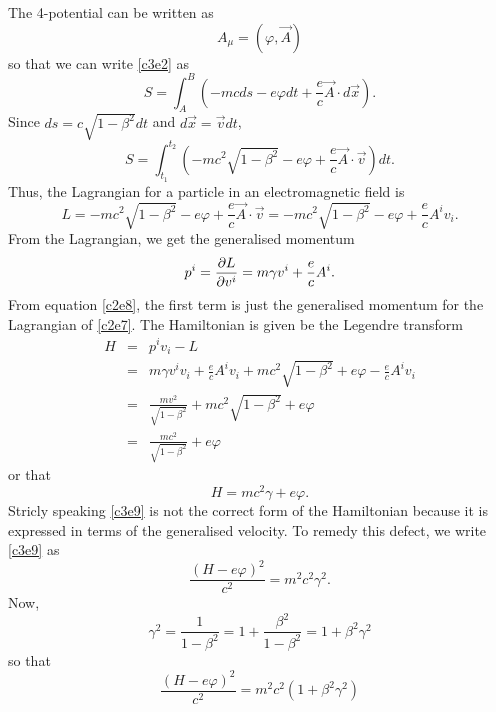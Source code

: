 \begin{enumerate}
The 4-potential can be written as 
\begin{equation}\label{c3e3}
A_\mu = (\varphi, \vec{A})
\end{equation}
so that we can write \eqref{c3e2} as
\begin{equation}\label{c3e4}
S = \int_A^B\left(-mcds - e\varphi dt + 
\frac{e}{c}\vec{A}\cdot d\vec{x}\right).
\end{equation}
Since $ds = c\sqrt{1 - \beta^2}dt$ and $d\vec{x} = \vec{v}dt$,
\begin{equation}\label{c3e5}
S = \int_{t_1}^{t_2}\left(-mc^2\sqrt{1 - \beta^2} - e\varphi + 
\frac{e}{c}\vec{A}\cdot\vec{v}\right)dt.
\end{equation}
Thus, the Lagrangian for a particle in an electromagnetic field is
\begin{equation}\label{c3e6}
L = -mc^2\sqrt{1 - \beta^2} - e\varphi + \frac{e}{c}\vec{A}\cdot\vec{v}
= -mc^2\sqrt{1 - \beta^2} - e\varphi + \frac{e}{c}A^i v_i.
\end{equation}
From the Lagrangian, we get the generalised momentum
\begin{equation}\label{c3e7}
p^i = \frac{\partial{L}}{\partial{v^i}} = m\gamma v^i + \frac{e}{c}A^i.
\end{equation}
From equation \eqref{c2e8}, the first term is just the generalised momentum for
the Lagrangian of \eqref{c2e7}. The Hamiltonian is given be the Legendre
transform
\begin{eqnarray*}
H &=& p^iv_i - L \\
  &=& m\gamma v^iv_i + \frac{e}{c}A^iv_i + mc^2\sqrt{1 - \beta^2} + e\varphi - 
  \frac{e}{c}A^iv_i \\
  &=& \frac{mv^2}{\sqrt{1 - \beta^2}} + mc^2\sqrt{1 - \beta^2} + e\varphi \\
  &=& \frac{mc^2}{\sqrt{1 - \beta^2}} + e\varphi
\end{eqnarray*}
or that
\begin{equation}\label{c3e8}
H = mc^2\gamma + e\varphi.
\end{equation}
Stricly speaking \eqref{c3e9} is not the correct form of the Hamiltonian because 
it is expressed in terms of the generalised velocity. To remedy this defect, we 
write
\eqref{c3e9} as
\[
\frac{(H - e\varphi)^2}{c^2} = m^2c^2 \gamma^2.
\]
Now,
\begin{equation}\label{c3e9}
\gamma^2 = \frac{1}{1 - \beta^2} = 1 + \frac{\beta^2}{1 - \beta^2} = 
1 + \beta^2\gamma^2
\end{equation}
so that
\[
\frac{(H - e\varphi)^2}{c^2} = m^2c^2(1 + \beta^2\gamma^2) 
\]
\end{enumerate}
